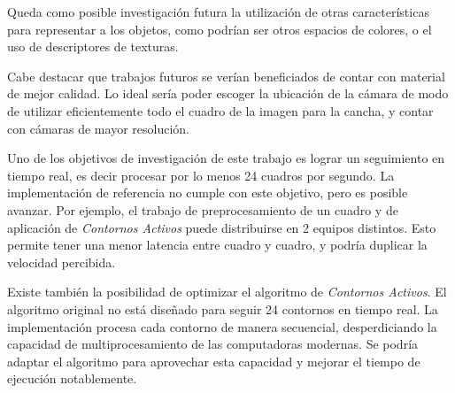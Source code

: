 Queda como posible investigación futura la utilización de otras características
para representar a los objetos, como podrían ser otros espacios de colores, o
el uso de descriptores de texturas.

Cabe destacar que trabajos futuros se verían beneficiados de contar con
material de mejor calidad. Lo ideal sería poder escoger la ubicación de la
cámara de modo de utilizar eficientemente todo el cuadro de la imagen para la
cancha, y contar con cámaras de mayor resolución.

Uno de los objetivos de investigación de este trabajo es lograr un seguimiento
en tiempo real, es decir procesar por lo menos 24 cuadros por segundo. La
implementación de referencia no cumple con este objetivo, pero es posible
avanzar. Por ejemplo, el trabajo de preprocesamiento de un cuadro y de
aplicación de \textit{Contornos Activos} puede distribuirse en 2 equipos
distintos. Esto permite tener una menor latencia entre cuadro y cuadro, y
podría duplicar la velocidad percibida.

Existe también la posibilidad de optimizar el algoritmo de \textit{Contornos
Activos}. El algoritmo original no está diseñado para seguir 24 contornos en
tiempo real. La implementación procesa cada contorno de manera secuencial,
desperdiciando la capacidad de multiprocesamiento de las computadoras modernas.
Se podría adaptar el algoritmo para aprovechar esta capacidad y mejorar el
tiempo de ejecución notablemente.

